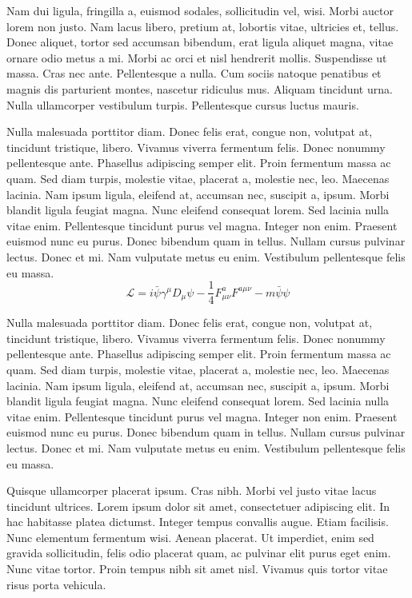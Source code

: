 \documentclass[AMA,Times1COL]{WileyNJDv5} %
\begin{document}
Nam dui ligula, fringilla a, euismod sodales, sollicitudin vel, wisi. Morbi auctor lorem non justo. Nam lacus libero,
pretium at, lobortis vitae, ultricies et, tellus. Donec aliquet, tortor sed accumsan bibendum, erat ligula aliquet magna,
vitae ornare odio metus a mi. Morbi ac orci et nisl hendrerit mollis. Suspendisse ut massa. Cras nec ante. Pellentesque
a nulla. Cum sociis natoque penatibus et magnis dis parturient montes, nascetur ridiculus mus. Aliquam tincidunt
urna. Nulla ullamcorper vestibulum turpis. Pellentesque cursus luctus mauris.

Nulla malesuada porttitor diam. Donec felis erat, congue non, volutpat at, tincidunt tristique, libero. Vivamus
viverra fermentum felis. Donec nonummy pellentesque ante. Phasellus adipiscing semper elit. Proin fermentum massa
ac quam. Sed diam turpis, molestie vitae, placerat a, molestie nec, leo. Maecenas lacinia. Nam ipsum ligula, eleifend
at, accumsan nec, suscipit a, ipsum. Morbi blandit ligula feugiat magna. Nunc eleifend consequat lorem. Sed lacinia
nulla vitae enim. Pellentesque tincidunt purus vel magna. Integer non enim. Praesent euismod nunc eu purus. Donec
bibendum quam in tellus. Nullam cursus pulvinar lectus. Donec et mi. Nam vulputate metus eu enim. Vestibulum
pellentesque felis eu massa.
\begin{equation}
\mathcal{L} = i \bar{\psi} \gamma^\mu D_\mu \psi
    - \frac{1}{4} F_{\mu\nu}^a F^{a\mu\nu} - m \bar{\psi} \psi
\label{eq26}
\end{equation}

Nulla malesuada porttitor diam. Donec felis erat, congue non, volutpat at, tincidunt tristique, libero. Vivamus
viverra fermentum felis. Donec nonummy pellentesque ante. Phasellus adipiscing semper elit. Proin fermentum massa
ac quam. Sed diam turpis, molestie vitae, placerat a, molestie nec, leo. Maecenas lacinia. Nam ipsum ligula, eleifend
at, accumsan nec, suscipit a, ipsum. Morbi blandit ligula feugiat magna. Nunc eleifend consequat lorem. Sed lacinia
nulla vitae enim. Pellentesque tincidunt purus vel magna. Integer non enim. Praesent euismod nunc eu purus. Donec
bibendum quam in tellus. Nullam cursus pulvinar lectus. Donec et mi. Nam vulputate metus eu enim. Vestibulum
pellentesque felis eu massa.

Quisque ullamcorper placerat ipsum. Cras nibh. Morbi vel justo vitae lacus tincidunt ultrices. Lorem ipsum dolor sit
amet, consectetuer adipiscing elit. In hac habitasse platea dictumst. Integer tempus convallis augue. Etiam facilisis.
Nunc elementum fermentum wisi. Aenean placerat. Ut imperdiet, enim sed gravida sollicitudin, felis odio placerat
quam, ac pulvinar elit purus eget enim. Nunc vitae tortor. Proin tempus nibh sit amet nisl. Vivamus quis tortor
vitae risus porta vehicula.
\end{document}
